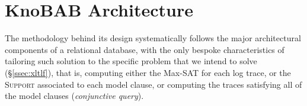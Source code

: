\section{KnoBAB Architecture}\label{sec:karch}
The methodology behind its design systematically follows the major architectural components of a relational database, with the only bespoke characteristics of tailoring such solution to the specific problem that we intend to solve (\S\ref{ssec:xltlf}), that is, computing either the Max-SAT for each log trace,  or the \textsc{Support} associated to each model clause, or computing the traces satisfying all of the model clauses (\textit{conjunctive query}).

